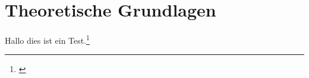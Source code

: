 \section{Theoretische Grundlagen}
\label{sec:Theorie}
\blindtext
Hallo dies ist ein Test.\footnote{\cite[S.~428]{Reim.2015}}
\blindtext